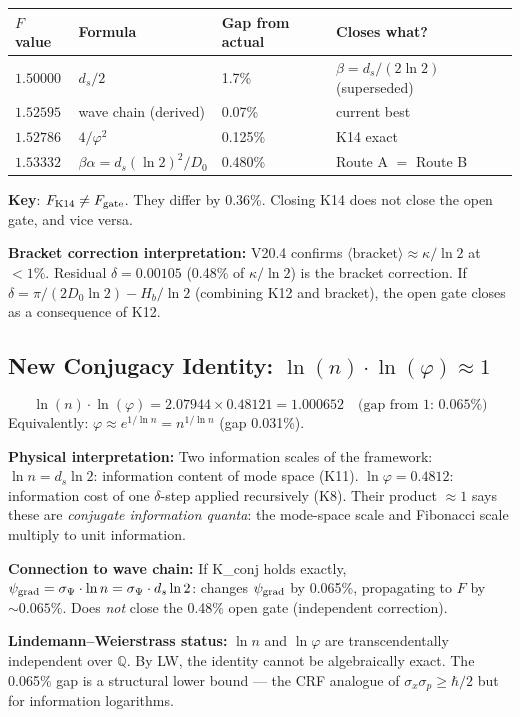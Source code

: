 \documentclass[12pt, a4paper]{article}
\begin{document}
\begin{keybox}[title={Three Distinct F-Targets (K14 $\neq$ Open Gate)}]
\begin{center}
\renewcommand{\arraystretch}{1.5}
\begin{tabular}{llll}
\toprule
$F$ value & Formula & Gap from actual & Closes what?\\
\midrule
$1.50000$ & $d_s/2$ & 1.7\% & $\beta=d_s/(2\ln 2)$ (superseded)\\
$1.52595$ & wave chain (derived) & 0.07\% & current best\\
$1.52786$ & $4/\varphi^2$ & 0.125\% & K14 exact\\
$1.53332$ & $\beta\alpha=d_s(\ln 2)^2/D_0$ & 0.480\% & Route A $=$ Route B\\
\bottomrule
\end{tabular}
\end{center}
\textbf{Key}: $F_{\rm K14}\neq F_{\rm gate}$. They differ by 0.36\%. Closing K14 does not close the open gate, and vice versa.

\textbf{Bracket correction interpretation:} V20.4 confirms $\langle\text{bracket}\rangle\approx\kappa/\ln 2$ at $<1\%$. Residual $\delta=0.00105$ (0.48\% of $\kappa/\ln 2$) is the bracket correction. If $\delta=\pi/(2D_0\ln 2)-H_b/\ln 2$ (combining K12 and bracket), the open gate closes as a consequence of K12.
\end{keybox}

\subsection{New Conjugacy Identity: $\ln(n)\cdot\ln(\varphi)\approx 1$}

\begin{keybox}[title={K\_conj: Conjugate Information Quanta (gap 0.065\%, new)}]
\[
  \ln(n)\cdot\ln(\varphi) = 2.07944\times 0.48121 = 1.000652 \quad\text{(gap from 1: }\mathbf{0.065\%}\text{)}
\]
Equivalently: $\varphi\approx e^{1/\ln n}=n^{1/\ln n}$ (gap 0.031\%).

\textbf{Physical interpretation:} Two information scales of the framework:
$\ln n=d_s\ln 2$: information content of mode space (K11).
$\ln\varphi=0.4812$: information cost of one $\delta$-step applied recursively (K8).
Their product $\approx 1$ says these are \emph{conjugate information quanta}: the mode-space scale and Fibonacci scale multiply to unit information.

\textbf{Connection to wave chain:} If K\_conj holds exactly, $\psi_{\rm grad}=\sigma_\Psi\cdot\ln n=\sigma_\Psi\cdot d_s\ln 2$: changes $\psi_{\rm grad}$ by 0.065\%, propagating to $F$ by $\sim 0.065\%$. Does \emph{not} close the 0.48\% open gate (independent correction).

\textbf{Lindemann--Weierstrass status:} $\ln n$ and $\ln\varphi$ are transcendentally independent over $\mathbb{Q}$. By LW, the identity cannot be algebraically exact. The 0.065\% gap is a structural lower bound --- the CRF analogue of $\sigma_x\sigma_p\geq\hbar/2$ but for information logarithms.
\end{keybox}
\end{document}
